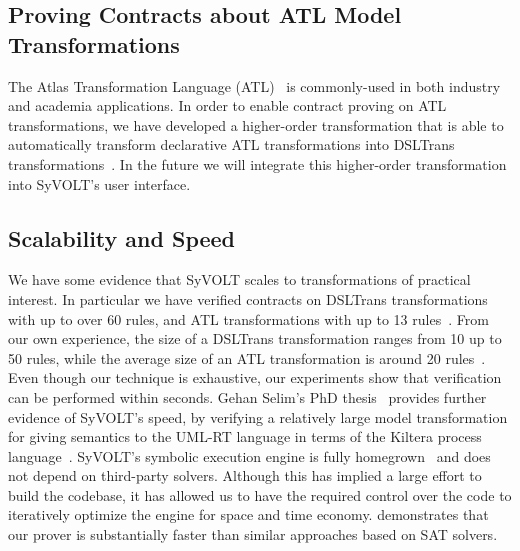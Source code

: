 \subsection{Proving Contracts about ATL Model Transformations}
The Atlas Transformation Language (ATL)~\cite{atlTool} is
commonly-used in both industry and academia applications. In order to enable contract proving on ATL transformations, we
have developed a higher-order transformation that is able to automatically
transform declarative ATL transformations into DSLTrans transformations~\cite{Oakes}. 
In the future we will integrate this higher-order transformation into SyVOLT's
user interface.

\subsection{Scalability and Speed}

We have some evidence that SyVOLT scales to transformations of practical
interest. In particular we have verified contracts on DSLTrans transformations with up to
over 60 rules, and ATL transformations with up to 13 rules~\cite{Oakes}. From our own
experience, the size of a DSLTrans transformation ranges from 10 up to 50 rules, while the average size of an ATL
transformation is around 20 rules~\cite{KuselSWRSK13}.
Even though our technique is exhaustive, our experiments show that verification can be performed within seconds.
Gehan Selim's PhD thesis~\cite{Selim2015} provides further evidence of SyVOLT's speed, by verifying a relatively large model transformation
for giving semantics to the UML-RT language in terms of the Kiltera process
language~\cite{PosseDingel2014}. SyVOLT's symbolic execution engine is fully
homegrown~\cite{LucioVang} and does not depend on third-party solvers. Although
this has implied a large effort to build the codebase, it has allowed us to
have the required control over the code to iteratively optimize the engine for
space and time economy.
\cite{Selim2014} demonstrates that our prover is substantially faster than
similar approaches based on SAT solvers.








